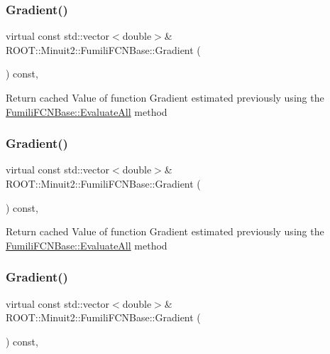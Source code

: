 \subsubsection{\texorpdfstring{Gradient()}{Gradient()}\hspace{0.1cm}{\footnotesize\ttfamily [1/6]}}
{\footnotesize\ttfamily virtual const std\+::vector$<$double$>$\& R\+O\+O\+T\+::\+Minuit2\+::\+Fumili\+F\+C\+N\+Base\+::\+Gradient (\begin{DoxyParamCaption}{ }\end{DoxyParamCaption}) const\hspace{0.3cm}{\ttfamily [inline]}, {\ttfamily [virtual]}}

Return cached Value of function Gradient estimated previously using the \mbox{\hyperlink{classROOT_1_1Minuit2_1_1FumiliFCNBase_a0741bb4a7405cc33ab60583472a189cb}{Fumili\+F\+C\+N\+Base\+::\+Evaluate\+All}} method \mbox{\label{classROOT_1_1Minuit2_1_1FumiliFCNBase_ad226939ea2e83f754b5a6afc30876d3e}} 
\subsubsection{\texorpdfstring{Gradient()}{Gradient()}\hspace{0.1cm}{\footnotesize\ttfamily [2/6]}}
{\footnotesize\ttfamily virtual const std\+::vector$<$double$>$\& R\+O\+O\+T\+::\+Minuit2\+::\+Fumili\+F\+C\+N\+Base\+::\+Gradient (\begin{DoxyParamCaption}{ }\end{DoxyParamCaption}) const\hspace{0.3cm}{\ttfamily [inline]}, {\ttfamily [virtual]}}

Return cached Value of function Gradient estimated previously using the \mbox{\hyperlink{classROOT_1_1Minuit2_1_1FumiliFCNBase_a0741bb4a7405cc33ab60583472a189cb}{Fumili\+F\+C\+N\+Base\+::\+Evaluate\+All}} method \mbox{\label{classROOT_1_1Minuit2_1_1FumiliFCNBase_ad226939ea2e83f754b5a6afc30876d3e}} 
\subsubsection{\texorpdfstring{Gradient()}{Gradient()}\hspace{0.1cm}{\footnotesize\ttfamily [3/6]}}
{\footnotesize\ttfamily virtual const std\+::vector$<$double$>$\& R\+O\+O\+T\+::\+Minuit2\+::\+Fumili\+F\+C\+N\+Base\+::\+Gradient (\begin{DoxyParamCaption}{ }\end{DoxyParamCaption}) const\hspace{0.3cm}{\ttfamily [inline]}, {\ttfamily [virtual]}}

